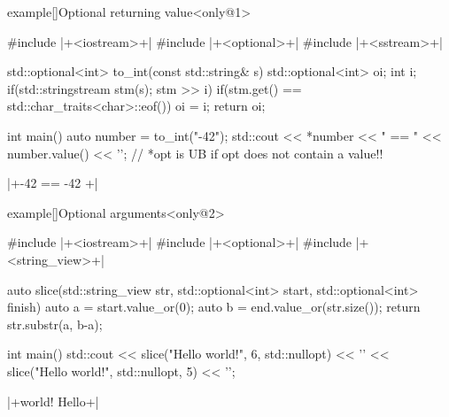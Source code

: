 \begin{frame}[fragile]{}
    \begin{varblock}{example}[\textwidth]{Optional returning value}<only@1>
        \begin{Cpp}
            #include |+<iostream>+|
            #include |+<optional>+|
            #include |+<sstream>+|

            std::optional<int> to_int(const std::string& s) {
                std::optional<int> oi{};
                int i;
                if(std::stringstream stm(s); stm >> i)
                    if(stm.get() == std::char_traits<char>::eof())
                        oi = i;
                return oi;
            }

            int main()
            {
                auto number = to_int("-42");
                std::cout << *number << " == " << number.value() << '\n';
                // *opt is UB if opt does not contain a value!!
            }
        \end{Cpp}
        \begin{Bash}[numbers=none]
            |+-42 == -42 +|
        \end{Bash}
    \end{varblock}
    \begin{varblock}{example}[\textwidth]{Optional arguments}<only@2>
        \begin{Cpp}
            #include |+<iostream>+|
            #include |+<optional>+|
            #include |+<string_view>+|

            auto slice(std::string_view str,
                       std::optional<int> start,
                       std::optional<int> finish)
            {
                auto a = start.value_or(0);
                auto b = end.value_or(str.size());
                return str.substr(a, b-a);
            }

            int main()
            {
                std::cout
                    << slice("Hello world!", 6, std::nullopt) << '\n'
                    << slice("Hello world!", std::nullopt, 5) << '\n';
            }
        \end{Cpp}
        \begin{Bash}[numbers=none]
            |+world!
            Hello+|
        \end{Bash}
    \end{varblock}
\end{frame}

